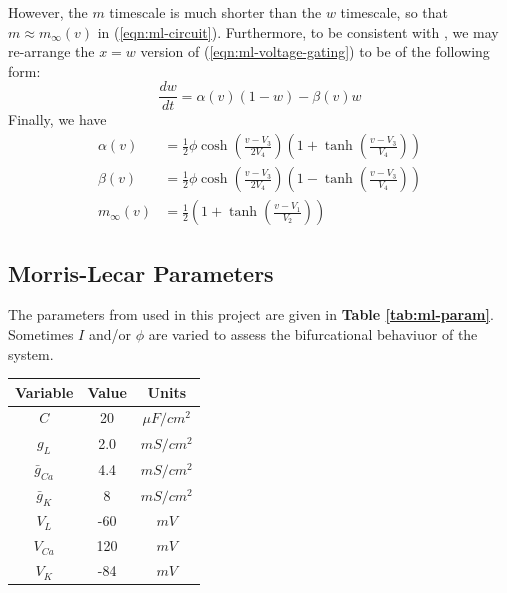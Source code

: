 \documentclass[letterpaper,12pt]{article}
\numberwithin{table}{section}
\numberwithin{figure}{section}
\numberwithin{equation}{section}
\newcommand*{\deriv}[2]{\frac{d #1}{d #2}}
\newcommand{\reftab}[1]{\textbf{Table \ref{#1}}}
\begin{document}
\begin{flushleft}
    However, the $m$ timescale is much shorter than the $w$ timescale, so that $m \approx m_\infty(v)$ in (\ref{eqn:ml-circuit}). Furthermore, to be consistent with \cite{snm}, we may re-arrange the $x = w$ version of (\ref{eqn:ml-voltage-gating}) to be of the following form:
    \begin{equation}
        \label{eqn:w-dyn}
        \deriv{w}{t} = \alpha(v)(1  - w) - \beta(v)w
    \end{equation}
    Finally, we have
    \begin{align}
        \label{eqn:alpha-def}
        \alpha(v) &= \frac{1}{2} \phi \cosh{\left(\frac{v - V_3}{2V_4}\right)}\left(1 + \tanh{\left(\frac{v - V_3}{V_4}\right)}\right) \\
        \label{eqn:beta-def}
        \beta(v) &= \frac{1}{2} \phi \cosh{\left(\frac{v - V_3}{2V_4}\right)}\left(1 - \tanh{\left(\frac{v - V_3}{V_4}\right)}\right) \\
        m_\infty(v) &= \frac{1}{2}\left(1 + \tanh{\left(\frac{v - V_1}{V_2}\right)}\right)
    \end{align}

    \subsection{Morris-Lecar Parameters}

    The parameters from \cite{snm} used in this project are given in \reftab{tab:ml-param}. Sometimes $I$ and/or $\phi$ are varied to assess the bifurcational behaviuor of the system.

    \begin{table}[h]

        \begin{subtable}{0.49\linewidth}

            \centering

            \begin{tabular}{ | c | c | c | }
                \hline
                Variable & Value & Units \\
                \hline\hline
                $C$ & 20 & $\mu F/cm^2$ \\
                \hline
                $g_L$ & 2.0 & $mS/cm^2$ \\
                \hline
                $\bar{g}_{Ca}$ & 4.4 & $mS/cm^2$ \\
                \hline
                $\bar{g}_K$ & 8 & $mS/cm^2$ \\
                \hline
                $V_L$ & -60 & $mV$ \\
                \hline
                $V_{Ca}$ & 120 & $mV$ \\
                \hline
                $V_K$ & -84 & $mV$ \\
                \hline
            \end{tabular}


\end{subtable}
\end{table}
\end{flushleft}
\end{document}
